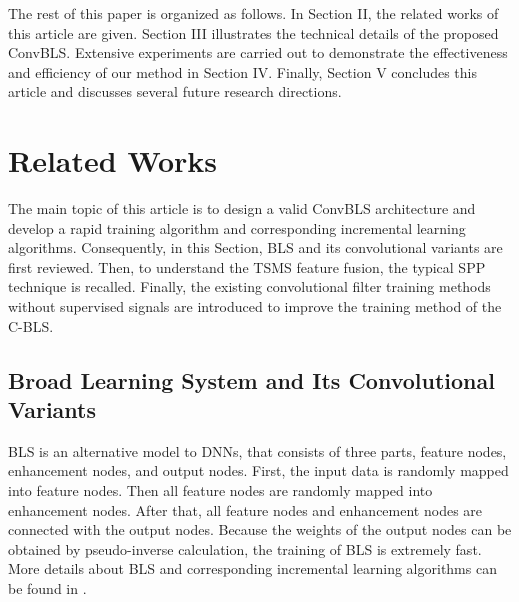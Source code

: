 \documentclass[lettersize,journal]{IEEEtran}
\begin{document}
The rest of this paper is organized as follows. In Section II, the related works of this article are given. Section III illustrates the technical details of the proposed ConvBLS. Extensive experiments are carried out to demonstrate the effectiveness and efficiency of our method in Section IV. Finally, Section V concludes this article and discusses several future research directions. 

\section{Related Works}
The main topic of this article is to design a valid ConvBLS architecture and develop a rapid training algorithm and corresponding incremental learning algorithms. Consequently, in this Section, BLS and its convolutional variants are first reviewed. Then, to understand the TSMS feature fusion, the typical SPP technique is recalled. Finally, the existing convolutional filter training methods without supervised signals are introduced to improve the training method of the C-BLS.

\subsection{Broad Learning System and Its Convolutional Variants}
BLS\cite{chen2017broad, chen2018universal} is an alternative model to DNNs, that consists of three parts, feature nodes, enhancement nodes, and output nodes. First, the input data is randomly mapped into feature nodes. Then all feature nodes are randomly mapped into enhancement nodes. After that, all feature nodes and enhancement nodes are connected with the output nodes. Because the weights of the output nodes can be obtained by pseudo-inverse calculation, the training of BLS is extremely fast. More details about BLS and corresponding incremental learning algorithms can be found in \cite{chen2017broad}.
\end{document}
